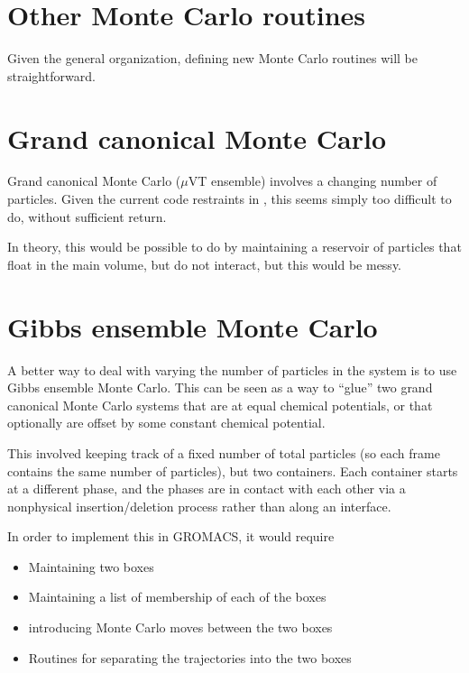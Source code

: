 \documentclass[11pt,a4paper,twoside]{article}
\begin{document}


\section{Other Monte Carlo routines}

Given the general organization, defining new Monte Carlo routines will
be straightforward.  

\section{Grand canonical Monte Carlo}

Grand canonical Monte Carlo ($\mu$VT ensemble) involves a changing
number of particles.  Given the current code restraints in \gromacs,
this seems simply too difficult to do, without sufficient return.

In theory, this would be possible to do by maintaining a reservoir of
particles that float in the main volume, but do not interact, but this
would be messy.

\section{Gibbs ensemble Monte Carlo} 

A better way to deal with varying the number of particles in the system
is to use Gibbs ensemble Monte Carlo. This can be seen as a way to
``glue'' two grand canonical Monte Carlo systems that are at equal
chemical potentials, or that optionally are offset by some constant
chemical potential.

This involved keeping track of a fixed number of total particles (so
each frame contains the same number of particles), but two containers.
Each container starts at a different phase, and the phases are in
contact with each other via a nonphysical insertion/deletion process
rather than along an interface.  

In order to implement this in GROMACS, it would require 
\begin{itemize}
\item Maintaining two boxes
\item Maintaining a list of membership of each of the boxes
\item introducing Monte Carlo moves between the two boxes
\item Routines for separating the trajectories into the two boxes
\end{itemize}
\end{document}
